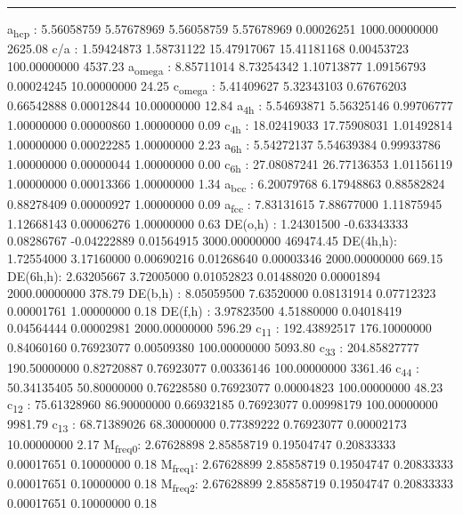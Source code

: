 \documentclass[11pt]{article}
\begin{document}
\noindent\rule{\textwidth}{0.5pt}
a\textsubscript{hcp}   :   5.56058759   5.57678969   5.56058759   5.57678969   0.00026251 1000.00000000      2625.08
c/a     :   1.59424873   1.58731122  15.47917067  15.41181168   0.00453723 100.00000000      4537.23
a\textsubscript{omega} :   8.85711014   8.73254342   1.10713877   1.09156793   0.00024245  10.00000000        24.25
c\textsubscript{omega} :   5.41409627   5.32343103   0.67676203   0.66542888   0.00012844  10.00000000        12.84
a\textsubscript{4h}    :   5.54693871   5.56325146   0.99706777   1.00000000   0.00000860   1.00000000         0.09
c\textsubscript{4h}    :  18.02419033  17.75908031   1.01492814   1.00000000   0.00022285   1.00000000         2.23
a\textsubscript{6h}    :   5.54272137   5.54639384   0.99933786   1.00000000   0.00000044   1.00000000         0.00
c\textsubscript{6h}    :  27.08087241  26.77136353   1.01156119   1.00000000   0.00013366   1.00000000         1.34
a\textsubscript{bcc}   :   6.20079768   6.17948863   0.88582824   0.88278409   0.00000927   1.00000000         0.09
a\textsubscript{fcc}   :   7.83131615   7.88677000   1.11875945   1.12668143   0.00006276   1.00000000         0.63
DE(o,h) :   1.24301500  -0.63343333   0.08286767  -0.04222889   0.01564915 3000.00000000    469474.45
DE(4h,h):   1.72554000   3.17160000   0.00690216   0.01268640   0.00003346 2000.00000000       669.15
DE(6h,h):   2.63205667   3.72005000   0.01052823   0.01488020   0.00001894 2000.00000000       378.79
DE(b,h) :   8.05059500   7.63520000   0.08131914   0.07712323   0.00001761   1.00000000         0.18
DE(f,h) :   3.97823500   4.51880000   0.04018419   0.04564444   0.00002981 2000.00000000       596.29
c\textsubscript{11}    : 192.43892517 176.10000000   0.84060160   0.76923077   0.00509380 100.00000000      5093.80
c\textsubscript{33}    : 204.85827777 190.50000000   0.82720887   0.76923077   0.00336146 100.00000000      3361.46
c\textsubscript{44}    :  50.34135405  50.80000000   0.76228580   0.76923077   0.00004823 100.00000000        48.23
c\textsubscript{12}    :  75.61328960  86.90000000   0.66932185   0.76923077   0.00998179 100.00000000      9981.79
c\textsubscript{13}    :  68.71389026  68.30000000   0.77389222   0.76923077   0.00002173  10.00000000         2.17
M\textsubscript{freq}\textsubscript{0}:   2.67628898   2.85858719   0.19504747   0.20833333   0.00017651   0.10000000         0.18
M\textsubscript{freq}\textsubscript{1}:   2.67628899   2.85858719   0.19504747   0.20833333   0.00017651   0.10000000         0.18
M\textsubscript{freq}\textsubscript{2}:   2.67628899   2.85858719   0.19504747   0.20833333   0.00017651   0.10000000         0.18
\end{document}
